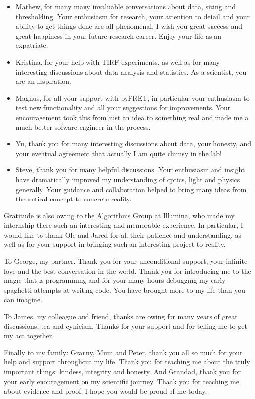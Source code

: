 \begin{itemize}
\item[] Mathew, for many many invaluable conversations about data, sizing and thresholding. Your enthusiasm for research, your attention to detail and your ability to get things done are all phenomenal. I wish you great success and great happiness in your future research career. Enjoy your life as an expatriate. 
\item[] Kristina, for your help with TIRF experiments, as well as for many interesting discussions about data analysis and statistics. As a scientist, you are an inspiration.
\item[] Magnus, for all your support with pyFRET, in particular your enthusiasm to test new functionality and all your suggestions for improvements. Your encouragement took this from just an idea to something real and made me a much better sofware engineer in the process.
\item[] Yu, thank you for many interesting discussions about data, your honesty, and your eventual agreement that actually I am quite clumsy in the lab!
\item[] Steve, thank you for many helpful discussions. Your enthusiasm and insight have dramatically improved my understanding of optics, light and physics generally. Your guidance and collaboration helped to bring many ideas from theoretical concept to concrete reality.
\end{itemize}

Gratitude is also owing to the Algorithms Group at Illumina, who made my internship there such an interesting and memorable experience. In particular, I would like to thank Ole and Jared for all their patience and understanding, as well as for your support in bringing such an interesting project to reality.

To George, my partner. Thank you for your unconditional support, your infinite love and the best conversation in the world. Thank you for introducing me to the magic that is programming and for your many hours debugging my early spaghetti attempts at writing code. You have brought more to my life than you can imagine.

To James, my colleague and friend, thanks are owing for many years of great discussions, tea and cynicism. Thanks for your support and for telling me to get my act together.

Finally to my family: Granny, Mum and Peter, thank you all so much for your help and support throughout my life. Thank you for teaching me about the truly important things: kindess, integrity and honesty. And Grandad, thank you for your early enouragement on my scientific journey. Thank you for teaching me about evidence and proof. I hope you would be proud of me today. 